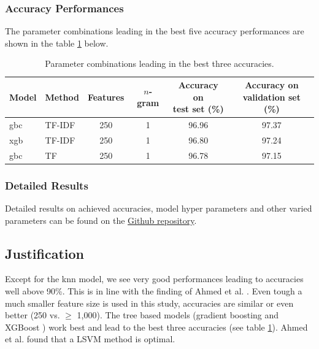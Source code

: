 \documentclass[a4paper,12pt,nottoc]{article}
\begin{document}
\subsubsection{Accuracy Performances}

The parameter combinations leading in the best five accuracy performances are shown in the table \ref{tab:accperf} below.

\begin{table}[h]
\begin{center}
\begin{tabular}{| l | l | c | c | c | c |}
\hline
Model & Method & Features & $n$-gram & \thead{Accuracy on \\ test set (\%)} & \thead{Accuracy on \\ validation set (\%)} \\
\hline
gbc & TF-IDF & 250 & 1 & 96.96 & 97.37 \\
xgb & TF-IDF & 250 & 1 & 96.80 & 97.24 \\
gbc & TF & 250 & 1 & 96.78 & 97.15	 \\
\hline 
\end{tabular}
\end{center}
\caption{Parameter combinations leading in the best three accuracies.}\label{tab:accperf}
\end{table}

\clearpage
\subsubsection{Detailed Results}

Detailed results on achieved accuracies, model hyper parameters and other varied parameters can be found on the \href{https://github.com/benjaminperucco/udacity-nano-mle/blob/master/5%20Capstone/2%20Project/3_postprocessing.ipynb}{Github repository}. 

\subsection{Justification}

Except for the knn model, we see very good performances leading to accuracies well above 90\%. This is in line with the finding of Ahmed et al. \cite{bib:ahmed-2017}. Even tough a much smaller feature size is used in this study, accuracies are similar or even better (250 vs. $\geq$ 1,000). The tree based models (gradient boosting \cite{bib:gbc} and XGBoost \cite{bib:xgb}) work best and lead to the best three accuracies (see table \ref{tab:accperf}). Ahmed et al. \cite{bib:ahmed-2017} found that a LSVM method is optimal.\\
\end{document}
